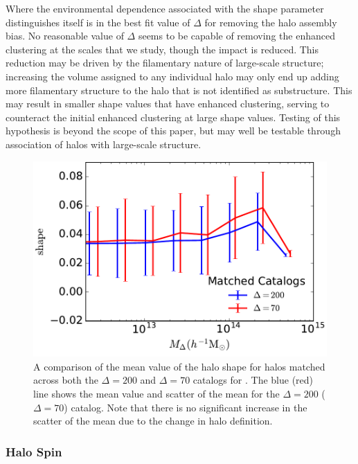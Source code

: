 \documentclass[usenatbib]{mnras}
\begin{document}
Where the environmental dependence associated with the shape parameter distinguishes itself is in the best
fit value of $\Delta$ for removing the halo assembly bias. No reasonable value of $\Delta$ seems to be
capable of removing the enhanced clustering at the scales that we study, though the impact is reduced.
This reduction may be driven by the filamentary nature of large-scale structure; increasing the volume
assigned to any individual halo may only end up adding more filamentary structure to the halo that is
not identified as substructure. This may result in smaller shape values that have enhanced clustering,
serving to counteract the initial enhanced clustering at large shape values. Testing of this hypothesis
is beyond the scope of this paper, but may well be testable through association of halos with large-scale
structure.


\begin{figure}
	\centering
	\includegraphics[width=.4\textwidth]{matched_catalog_shapecomp.pdf}
	\caption{A comparison of the mean value of the halo shape for halos matched across both
	the $\Delta = 200$ and $\Delta = 70$ catalogs for \simB. The blue (red) line shows the mean value and scatter of
	the	mean for the $\Delta = 200$ ($\Delta = 70$) catalog. Note that there is no significant
	increase in the scatter of the mean due to the change in halo definition.}
	\label{fig:matched_shapecomp}
\end{figure}


\subsubsection{Halo Spin}
\end{document}
